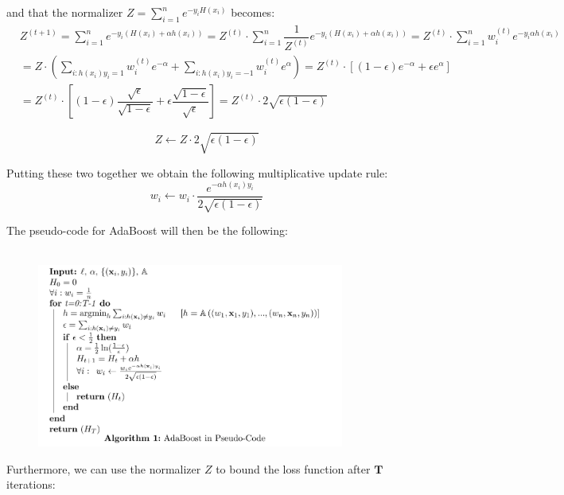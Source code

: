 \documentclass[twoside]{article}
\begin{document}
and that the normalizer $Z = \sum_{i=1}^{n} e^{-y_{i}H(x_{i})} $ becomes:
\begin{equation*}
\begin{aligned}
&  
  Z^{(t+1)} = \sum_{i=1}^{n} e^{-y_{i}(H(x_{i})+ \alpha h(x_{i}))} = Z^{(t)} \cdot \sum_{i=1}^{n} \dfrac{1}{Z^{(t)}} e^{-y_{i}(H(x_{i})+ \alpha h(x_{i}))} = Z^{(t)} \cdot \sum_{i=1}^{n} w_{i}^{(t)} e^{-y_{i} \alpha h(x_{i})}
  \\
  &  = Z \cdot ( \sum_{i:h(x_{i})y_{i}=1} w_{i}^{(t)} e^{-\alpha} + \sum_{i:h(x_{i})y_{i}=-1} w_{i}^{(t)} e^{\alpha}) = Z^{(t)} \cdot [(1-\epsilon)e^{-\alpha} + \epsilon e^{\alpha} ] \\ 
  & = Z^{(t)} \cdot [(1-\epsilon) \dfrac{\sqrt{\epsilon}}{\sqrt{1-\epsilon}} + \epsilon \dfrac{\sqrt{1-\epsilon}}{\sqrt{\epsilon}}  ] = Z^{(t)} \cdot 2\sqrt{\epsilon (1-\epsilon)}
\end{aligned}
\end{equation*}

$$Z \leftarrow Z \cdot 2 \sqrt{\epsilon (1-\epsilon)}$$

Putting these two together we obtain the following multiplicative update rule:
$$ w_{i} \leftarrow w_{i} \cdot \dfrac{e^{-\alpha h(x_{i}) y_{i}}}{2 \sqrt{\epsilon (1-\epsilon)}}$$

The pseudo-code for AdaBoost will then be the following: 
\\ \\ 
\begin{figure}[h]
\centering
\includegraphics[width=0.9\textwidth]{img/adaboost.png}
\end{figure}

\newpage
Furthermore, we can use the normalizer $Z$ to bound the loss function after $\mathbf{T}$ iterations:
\end{document}
